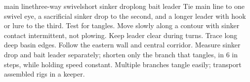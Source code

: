 
{{main line}{three-way swivel}{short sinker drop}{long bait leader}}
{Tie main line to one swivel eye, a sacrificial sinker drop to the second, and
a longer leader with hook or lure to the third. Test for tangles.}
{Move slowly along a contour with sinker contact intermittent, not plowing.
Keep leader clear during turns.}
{Trace long deep basin edges.}
{Follow the eastern wall and central corridor.}
{Measure sinker drop and bait leader separately; shorten only the branch that
tangles, in 6 in steps, while holding speed constant.}
{Multiple branches tangle easily; transport assembled rigs in a keeper.}
